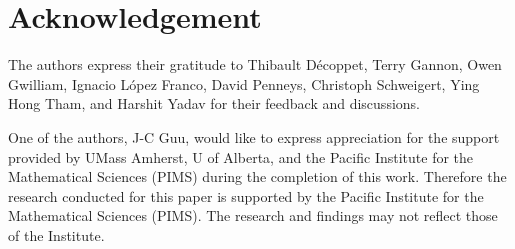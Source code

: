 \section*{Acknowledgement}

The authors express their gratitude to
Thibault Décoppet,
Terry Gannon,
Owen Gwilliam,
Ignacio L\'{o}pez Franco,
David Penneys,
Christoph Schweigert,
Ying Hong Tham,
and
Harshit Yadav
for their feedback and discussions.

One of the authors, J-C Guu, would like to express appreciation for the support
provided by UMass Amherst, U of Alberta, and the Pacific Institute for the
Mathematical Sciences (PIMS) during the completion of this work.
Therefore the research conducted for this paper is supported by the Pacific Institute for the
Mathematical Sciences (PIMS). The research and findings may not reflect those of the Institute.
